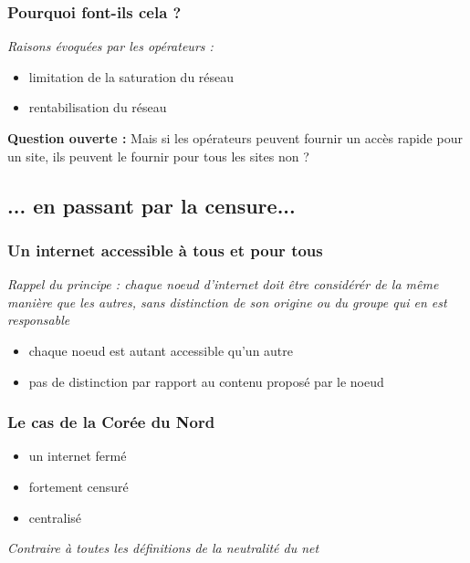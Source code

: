 \begin{frame}\frametitle{Pourquoi font-ils cela ?}
    \emph{Raisons évoquées par les opérateurs :}
    \begin{itemize}
        \item limitation de la saturation du réseau
        \item rentabilisation du réseau\\
    \end{itemize}

    \textbf{Question ouverte : } Mais si les opérateurs peuvent fournir un
    accès rapide pour un site, ils peuvent le fournir pour tous les sites non ?
\end{frame}


\subsection{... en passant par la censure...}
\begin{frame}\frametitle{Un internet accessible à tous et pour tous}
    \emph{Rappel du principe : chaque noeud d'internet doit être considérér de
        la même manière que les autres, sans distinction de son origine ou du
    groupe qui en est responsable}

    \vspace{1em}

    \begin{itemize}
        \item chaque noeud est autant accessible qu'un autre
        \item pas de distinction par rapport au contenu proposé par le noeud
    \end{itemize}
\end{frame}


\begin{frame}\frametitle{Le cas de la Corée du Nord}
    \begin{itemize}
        \item un internet fermé
        \item fortement censuré
        \item centralisé
    \end{itemize}

    \vspace{1em}

    \color{red}\emph{Contraire à toutes les définitions de la neutralité du net}
\end{frame}


